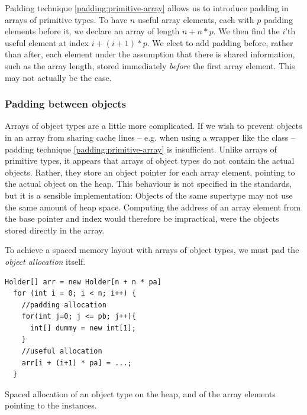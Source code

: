 Padding technique \ref{padding:primitive-array} allows us to introduce padding
in arrays of primitive types.
To have $n$ useful array elements, each with $p$ padding elements before it, we
declare an array of length $n + n * p$. We then find the $i$'th useful element
at index $i + (i+1) * p$. We elect to add padding before, rather than after,
each element under the assumption that there is shared information, such as
the array length, stored immediately \textit{before} the first array element.
This may not actually be the case.

\subsubsection{Padding between objects}
Arrays of object types are a little more complicated.
If we wish to prevent objects in an array from sharing cache lines -- e.g.
when using a  wrapper like the  class -- padding technique
\ref{padding:primitive-array} is insufficient. Unlike arrays of primitive
types, it appears that arrays of object types do not contain the actual objects.
Rather, they store an object pointer for each array element, pointing to the
actual object on the heap. This behaviour is not specified in the standards, but
it is a sensible implementation: Objects of the same supertype may not use the
same amount of heap space. Computing the address of an array element from the
base pointer and index would therefore be impractical, were the objects
stored directly in the array.

To achieve a spaced memory layout with arrays of object types, we must pad the
\textit{object allocation} itself.

\begin{padding}[h]
\begin{Verbatim}[frame=single]
  Holder[] arr = new Holder[n + n * pa]
  for (int i = 0; i < n; i++) {
    //padding allocation
    for(int j=0; j <= pb; j++){
      int[] dummy = new int[1];
    }
    //useful allocation
    arr[i + (i+1) * pa] = ...;
  }
\end{Verbatim}
	\caption{Spaced allocation of an object type on the heap, and of the
	array elements pointing to the instances.}
	\label{padding:object-array}
\end{padding}

